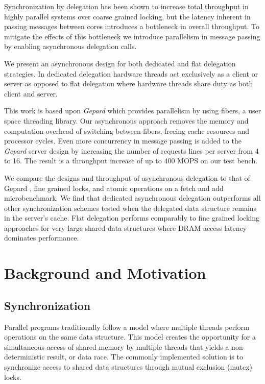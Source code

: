 \documentclass{uicthesi}
\begin{document}
\summary
Synchronization by delegation has been shown to increase total throughput in highly parallel systems over coarse grained locking, \cite{ffwd} but the latency inherent in passing messages between cores introduces a bottleneck in overall throughput. To mitigate the effects of this bottleneck we introduce parallelism in message passing by enabling asynchronous delegation calls. 

We present an asynchronous design for both dedicated and flat delegation strategies. In dedicated delegation hardware threads act exclusively as a client or server as opposed to flat delegation where hardware threads share duty as both client and server. 

This work is based upon \textit{Gepard} which provides parallelism by using fibers, a user space threading library. Our asynchronous approach removes the memory and computation overhead of switching between fibers, freeing cache resources and processor cycles. Even more concurrency in message passing is added to the \textit{Gepard} server design by increasing the number of requests lines per server from 4 to 16. The result is a throughput increase of up to 400 MOPS on our test bench.  

We compare the designs and throughput of asynchronous delegation to that of Gepard \cite{gepard}, fine grained locks, and atomic operations on a fetch and add microbenchmark. We find that dedicated asynchronous delegation outperforms all other synchronization schemes tested when the delegated data structure remains in the server's cache. Flat delegation performs comparably to fine grained locking approaches for very large shared data structures where DRAM access latency dominates performance. 

\chapter{Background and Motivation}
\section{Synchronization}
Parallel programs traditionally follow a model where multiple threads perform operations on the same data structure. This model creates the opportunity for a simultaneous access of shared memory by multiple threads that yields a non-deterministic result, or data race. The commonly implemented solution is to synchronize access to shared data structures through mutual exclusion (mutex) locks. 
\end{document}
